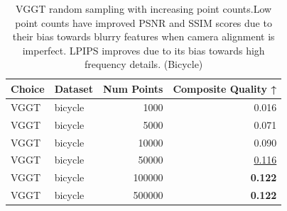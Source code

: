 \begin{table}[H]
\caption{\ifdefined\customcaption \customcaption \else VGGT random sampling with increasing point counts.Low point counts have improved PSNR and SSIM scores due to their bias towards blurry features when camera alignment is imperfect. LPIPS improves due to its bias towards high frequency details. (Bicycle) \fi}
\label{tab:03_sampling_mode_single_bicycle}
\centering
\scriptsize
\begin{tabular}{llrr}
\toprule
Choice & Dataset & Num Points & Composite Quality ↑ \\
\midrule
VGGT & bicycle & 1000 & 0.016 \\
VGGT & bicycle & 5000 & 0.071 \\
VGGT & bicycle & 10000 & 0.090 \\
VGGT & bicycle & 50000 & \underline{0.116} \\
VGGT & bicycle & 100000 & \textbf{0.122} \\
VGGT & bicycle & 500000 & \textbf{0.122} \\
\bottomrule
\end{tabular}
\end{table}